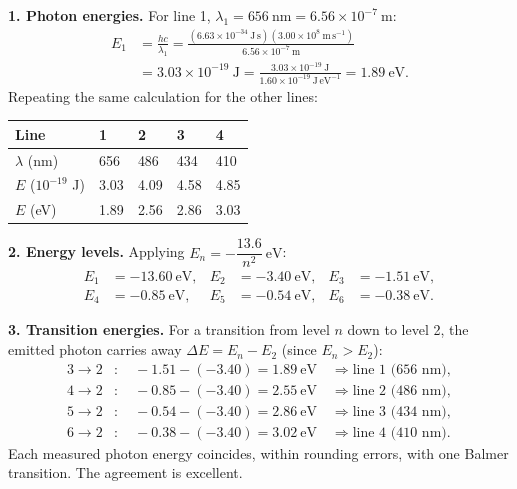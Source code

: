 \documentclass[11pt]{article}
\newcounter{popsec}
\newcounter{popsub}
\newcommand{\courssub}[1]{%
  \stepcounter{popsub}%
  \par\vspace{9pt}\noindent{\popxbold\fontsize{11.5}{13}\selectfont\color{popink}{\color{poporange}\thepopsec.\thepopsub}\hspace{6pt}#1}\par\nopagebreak\vspace{4pt}
}
\begin{document}
\courssub{Model Answer}
\begin{exoresolu}
\textbf{1. Photon energies.}
For line 1, $\lambda_1 = 656\ \mathrm{nm} = 6.56\times 10^{-7}\ \mathrm{m}$:
\begin{align*}
E_1 &= \frac{hc}{\lambda_1} = \frac{(6.63\times 10^{-34}\ \mathrm{J\,s})(3.00\times 10^{8}\ \mathrm{m\,s^{-1}})}{6.56\times 10^{-7}\ \mathrm{m}} \\
&= 3.03\times 10^{-19}\ \mathrm{J} = \frac{3.03\times 10^{-19}\ \mathrm{J}}{1.60\times 10^{-19}\ \mathrm{J\,eV^{-1}}} = 1.89\ \mathrm{eV}.
\end{align*}
Repeating the same calculation for the other lines:

\begin{center}
\begin{tabularx}{\linewidth}{|l|X|X|X|X|}
\hline
\rowcolor{popblueL} Line & 1 & 2 & 3 & 4 \\
\hline
$\lambda$ (nm) & 656 & 486 & 434 & 410 \\
\hline
$E$ ($10^{-19}$ J) & 3.03 & 4.09 & 4.58 & 4.85 \\
\hline
$E$ (eV) & 1.89 & 2.56 & 2.86 & 3.03 \\
\hline
\end{tabularx}
\end{center}

\textbf{2. Energy levels.}
Applying $E_n = -\dfrac{13.6}{n^2}\ \mathrm{eV}$:
\begin{align*}
E_1 &= -13.60\ \mathrm{eV}, & E_2 &= -3.40\ \mathrm{eV}, & E_3 &= -1.51\ \mathrm{eV},\\
E_4 &= -0.85\ \mathrm{eV}, & E_5 &= -0.54\ \mathrm{eV}, & E_6 &= -0.38\ \mathrm{eV}.
\end{align*}

\textbf{3. Transition energies.}
For a transition from level $n$ down to level 2, the emitted photon carries away $\Delta E = E_n - E_2$ (since $E_n > E_2$):
\begin{align*}
3\rightarrow 2 &: \quad -1.51 - (-3.40) = 1.89\ \mathrm{eV} \quad \Rightarrow \text{line 1 (656 nm)},\\
4\rightarrow 2 &: \quad -0.85 - (-3.40) = 2.55\ \mathrm{eV} \quad \Rightarrow \text{line 2 (486 nm)},\\
5\rightarrow 2 &: \quad -0.54 - (-3.40) = 2.86\ \mathrm{eV} \quad \Rightarrow \text{line 3 (434 nm)},\\
6\rightarrow 2 &: \quad -0.38 - (-3.40) = 3.02\ \mathrm{eV} \quad \Rightarrow \text{line 4 (410 nm)}.
\end{align*}
Each measured photon energy coincides, within rounding errors, with one Balmer transition. The agreement is excellent.


\end{exoresolu}
\end{document}
